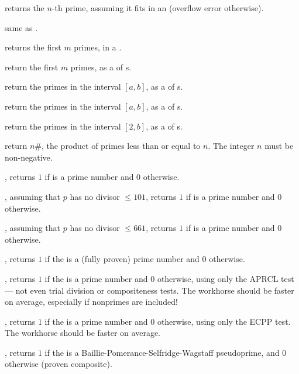  returns the $n$-th prime, assuming it fits in an
 (overflow error otherwise).

 same as .

 returns the first $m$ primes, in a
.

 return the first $m$ primes, as a  of
s.

 return the primes in the interval
$[a,b]$, as a  of s.

 return the primes in the
interval $[a,b]$, as a  of s.

 return the primes in the interval $[2,b]$,
as a  of s.

 return $n\#$, the product of primes less than
or equal to $n$. The integer $n$ must be non-negative.


, returns $1$ if  is a prime number and
$0$ otherwise.

, assuming that $p$ has no divisor $\leq
101$, returns $1$ if  is a prime number and $0$ otherwise.

, assuming that $p$ has no divisor $\leq
661$, returns $1$ if  is a prime number and $0$ otherwise.

, returns $1$ if the   is a
(fully proven) prime number and $0$ otherwise.

, returns $1$ if the   is a
prime number and $0$ otherwise, using only the APRCL test --- not even trial
division or compositeness tests. The workhorse  should be
faster on average, especially if nonprimes are included!

, returns $1$ if the   is a
prime number and $0$ otherwise, using only the ECPP test. The workhorse
 should be faster on average.

, returns $1$ if the   is a
Baillie-Pomerance-Selfridge-Wagstaff pseudoprime, and $0$ otherwise (proven
composite).

